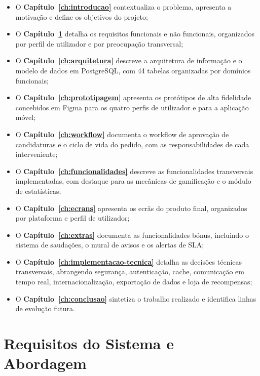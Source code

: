 \documentclass[12pt,a4paper]{report}
\begin{document}
\begin{itemize}
  \item O \textbf{Capítulo~\ref{ch:introducao}} contextualiza o problema, apresenta a motivação e define os objetivos do projeto;
  \item O \textbf{Capítulo~\ref{ch:requisitos}} detalha os requisitos funcionais e não funcionais, organizados por perfil de utilizador e por preocupação transversal;
  \item O \textbf{Capítulo~\ref{ch:arquitetura}} descreve a arquitetura de informação e o modelo de dados em PostgreSQL, com 44 tabelas organizadas por domínios funcionais;
  \item O \textbf{Capítulo~\ref{ch:prototipagem}} apresenta os protótipos de alta fidelidade concebidos em Figma para os quatro perfis de utilizador e para a aplicação móvel;
  \item O \textbf{Capítulo~\ref{ch:workflow}} documenta o workflow de aprovação de candidaturas e o ciclo de vida do pedido, com as responsabilidades de cada interveniente;
  \item O \textbf{Capítulo~\ref{ch:funcionalidades}} descreve as funcionalidades transversais implementadas, com destaque para as mecânicas de gamificação e o módulo de estatísticas;
  \item O \textbf{Capítulo~\ref{ch:ecrans}} apresenta os ecrãs do produto final, organizados por plataforma e perfil de utilizador;
  \item O \textbf{Capítulo~\ref{ch:extras}} documenta as funcionalidades bónus, incluindo o sistema de saudações, o mural de avisos e os alertas de SLA;
  \item O \textbf{Capítulo~\ref{ch:implementacao-tecnica}} detalha as decisões técnicas transversais, abrangendo segurança, autenticação, cache, comunicação em tempo real, internacionalização, exportação de dados e loja de recompensas;
  \item O \textbf{Capítulo~\ref{ch:conclusao}} sintetiza o trabalho realizado e identifica linhas de evolução futura.
\end{itemize}

\chapter{Requisitos do Sistema e Abordagem}
\label{ch:requisitos}
\end{document}
